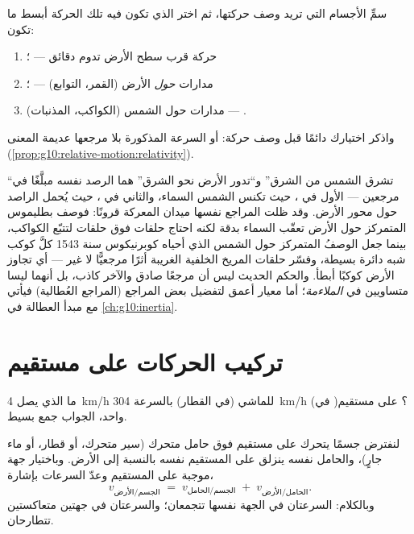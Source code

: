 \begin{method}\label{met:g10:relative-motion:choose}
سمِّ الأجسام التي تريد وصف حركتها، ثم اختر 
الذي تكون فيه تلك الحركة أبسط ما تكون:
\begin{enumerate}
  \item حركة قرب سطح الأرض تدوم دقائق --- ؛
  \item مدارات \emph{حول} الأرض (القمر، التوابع) --- ؛
  \item مدارات حول الشمس (الكواكب، المذنبات) --- .
\end{enumerate}
واذكر اختيارك دائمًا قبل وصف حركة:  أو
السرعة المذكورة بلا مرجعها عديمة المعنى
(\cref{prop:g10:relative-motion:relativity}).
\end{method}

\begin{remark}\label{rem:g10:relative-motion:history}
``تشرق الشمس من الشرق'' و``تدور الأرض نحو الشرق'' هما
الرصد نفسه مبلَّغًا في مرجعين --- الأول في ، حيث تكنس الشمس السماء، والثاني في ، حيث يُحمل الراصد حول محور الأرض. وقد ظلت
المراجع نفسها ميدان المعركة قرونًا: فوصف بطليموس
المتمركز حول الأرض تعقّب السماء بدقة لكنه احتاج حلقات
فوق حلقات لتتبّع الكواكب، بينما جعل الوصفُ المتمركز حول الشمس
الذي أحياه كوبرنيكوس سنة 1543 كلَّ كوكب شبه دائرة بسيطة،
وفسّر حلقات المريخ الخلفية الغريبة أثرًا مرجعيًّا لا غير ---
أي تجاوز الأرض كوكبًا أبطأ. والحكم الحديث ليس أن مرجعًا
صادق والآخر كاذب، بل أنهما ليسا متساويين في
\emph{الملاءمة}؛ أما معيار أعمق لتفضيل بعض المراجع
(المراجع العُطالية) فيأتي مع مبدأ العطالة في
\cref{ch:g10:inertia}.
\end{remark}

\section{تركيب الحركات على مستقيم}

ما الذي يصل \qty{4}{km/h} للماشي (في  القطار) بالسرعة
\qty{304}{km/h} (في )؟ على مستقيم واحد، الجواب جمع
بسيط.

\begin{proposition}\label{prop:g10:relative-motion:compose}
لنفترض جسمًا يتحرك على مستقيم فوق حامل متحرك (سير متحرك،
أو قطار، أو ماء جارٍ)، والحامل نفسه ينزلق على المستقيم نفسه
بالنسبة إلى الأرض. وباختيار جهة موجبة على المستقيم
وعدّ السرعات بإشارة،
\[
v_{\text{الجسم/الأرض}} \;=\; v_{\text{الجسم/الحامل}} \;+\;
v_{\text{الحامل/الأرض}} .
\]
وبالكلام: السرعتان في الجهة نفسها تتجمعان؛ والسرعتان في جهتين
متعاكستين تتطارحان.
\end{proposition}

